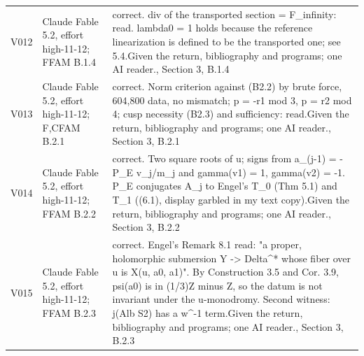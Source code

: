 \begin{longtable}{@{}L{.08\linewidth}L{.31\linewidth}L{.56\linewidth}@{}}
V012 & Claude Fable 5.2, effort high-11-12; F\newline FAM B.1.4 & correct. div of the transported section = F\_\allowbreak{}infinity:\allowbreak{} read. lambda0 = 1 holds because the reference linearization is defined to be the transported one; see 5.4.\newline Given the return, bibliography and programs; one AI reader.\newline {}, Section 3, B.1.4\\
V013 & Claude Fable 5.2, effort high-11-12; F,C\newline FAM B.2.1 & correct. Norm criterion against (B2.2) by brute force, 604,800 data, no mismatch; p = -r1 mod 3, p = r2 mod 4; cusp necessity (B2.3) and sufficiency:\allowbreak{} read.\newline Given the return, bibliography and programs; one AI reader.\newline {}, Section 3, B.2.1\\
V014 & Claude Fable 5.2, effort high-11-12; F\newline FAM B.2.2 & correct. Two square roots of u; signs from a\_\allowbreak{}(j-1) = -P\_\allowbreak{}E v\_\allowbreak{}j/\allowbreak{}m\_\allowbreak{}j and gamma(v1) = 1, gamma(v2) = -1. P\_\allowbreak{}E conjugates A\_\allowbreak{}j to Engel's T\_\allowbreak{}0 (Thm 5.1) and T\_\allowbreak{}1 ((6.1), display garbled in my text copy).\newline Given the return, bibliography and programs; one AI reader.\newline {}, Section 3, B.2.2\\
V015 & Claude Fable 5.2, effort high-11-12; F\newline FAM B.2.3 & correct. Engel's Remark 8.1 read:\allowbreak{} "a proper, holomorphic submersion Y -> Delta\textasciicircum{}* whose fiber over u is X(u, a0, a1)". By Construction 3.5 and Cor. 3.9, psi(a0) is in (1/\allowbreak{}3)Z minus Z, so the datum is not invariant under the u-monodromy. Second witness:\allowbreak{} j(Alb S2) has a w\textasciicircum{}-1 term.\newline Given the return, bibliography and programs; one AI reader.\newline {}, Section 3, B.2.3\\

\end{longtable}
